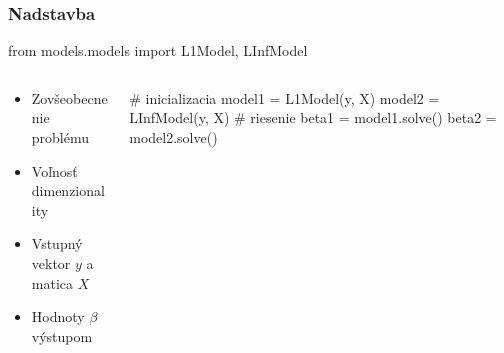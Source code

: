 \documentclass[presentation.tex]{subfiles}
\begin{document}
	\begin{frame}[fragile]
		\frametitle{Nadstavba}
                \begin{python}
from models.models import L1Model, LInfModel
                \end{python}
        \begin{columns}
            \begin{column}{0.5\textwidth}
                \begin{itemize}
                    \item Zovšeobecnenie problému
                    \item Voľnosť dimenzionality
                    \item Vstupný vektor $y$ a matica $X$
                    \item Hodnoty $\beta$ výstupom
                \end{itemize}
            \end{column}

            \begin{column}{0.5\textwidth}
                \begin{python}
# inicializacia
model1 = L1Model(y, X)
model2 = LInfModel(y, X)
# riesenie
beta1 = model1.solve()
beta2 = model2.solve()
                \end{python}
            \end{column}
        \end{columns}
	\end{frame}
\end{document}
